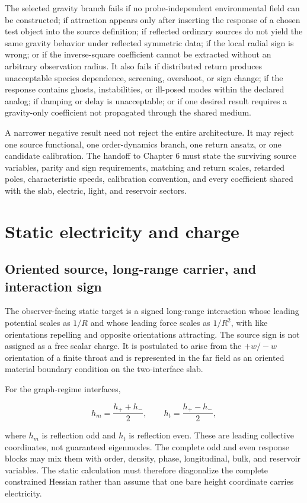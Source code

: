 The selected gravity branch fails if no probe-independent environmental field
can be constructed; if attraction appears only after inserting the response of
a chosen test object into the source definition; if reflected ordinary sources
do not yield the same gravity behavior under reflected symmetric data; if the
local radial sign is wrong; or if the inverse-square coefficient cannot be
extracted without an arbitrary observation radius. It also fails if distributed
return produces unacceptable species dependence, screening, overshoot, or sign
change; if the response contains ghosts, instabilities, or ill-posed modes within
the declared analog; if damping or delay is unacceptable; or if
one desired result requires a gravity-only coefficient not propagated through
the shared medium.

A narrower negative result need not reject the entire architecture. It may
reject one source functional, one order-dynamics branch, one return ansatz, or
one candidate calibration. The handoff to Chapter 6 must state the surviving
source variables, parity and sign requirements, matching and return scales,
retarded poles, characteristic speeds, calibration convention, and every
coefficient shared with the slab, electric, light, and reservoir sectors.

\section{Static electricity and charge}

\subsection{Oriented source, long-range carrier, and interaction sign}

The observer-facing static target is a signed long-range interaction whose
leading potential scales as \(1/R\) and whose leading force scales as
\(1/R^2\), with like orientations repelling and opposite orientations
attracting. The source sign is not assigned as a free scalar charge. It is
postulated to arise from the \(+w/-w\) orientation of a finite throat and is
represented in the far field as an oriented material boundary condition on the
two-interface slab.

For the graph-regime interfaces,

\[
h_m=\frac{h_++h_-}{2},
\qquad
h_t=\frac{h_+-h_-}{2},
\]

where \(h_m\) is reflection odd and \(h_t\) is reflection even. These are
leading collective coordinates, not guaranteed eigenmodes. The complete odd
and even response blocks may mix them with order, density, phase,
longitudinal, bulk, and reservoir variables. The static calculation must
therefore diagonalize the complete constrained Hessian rather than assume that
one bare height coordinate carries electricity.

